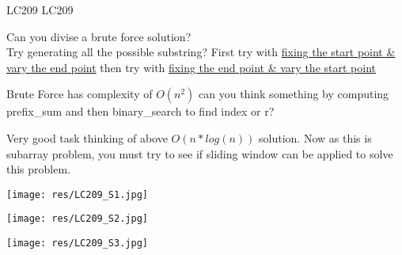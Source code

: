\begin{problem}{LC209}
    LC209
\end{problem}

\begin{guide}
    Can you divise a brute force solution? \\
    Try generating all the possible substring? First try with \underline{fixing the start point \& vary the end point} then try with \underline{fixing the end point \& vary the start point}

    Brute Force has complexity of ${O(n^2)}$ can you think something by computing prefix\_sum and then binary\_search to find index or r?

    Very good task thinking of above $O(n*log(n))$ solution. Now as this is subarray problem, you must try to see if sliding window can be applied to solve this problem.

\end{guide}

\begin{solution}
    
    \texttt{[image: res/LC209\_S1.jpg]}
\end{solution}

\begin{solution}

    \texttt{[image: res/LC209\_S2.jpg]}
    
\end{solution}

\begin{solution}
    \texttt{[image: res/LC209\_S3.jpg]}
    
\end{solution}